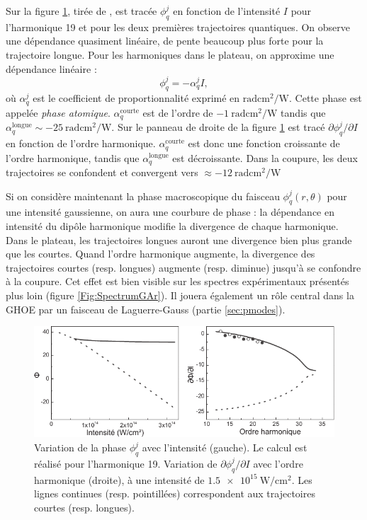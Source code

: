 Sur la figure \ref{fig:varju}, tirée de , est tracée $\phi^j_q$ en fonction de l'intensité $I$ pour l'harmonique 19 et pour les deux premières trajectoires quantiques. On observe une dépendance quasiment linéaire, de pente beaucoup plus forte pour la trajectoire longue. Pour les harmoniques dans le plateau, on approxime une dépendance linéaire :
\begin{equation}
\phi^j_q = - \alpha_q^j I,
\label{eq:alphaI}
\end{equation}
où $\alpha_q^j$ est le coefficient de proportionnalité exprimé en $\si{\radian\cm\squared\per\W}$. Cette phase est appelée \textit{phase atomique}. $\alpha_q^{\text{courte}}$ est de l'ordre de $\SI{-1}{\radian\cm\squared\per\W}$ tandis que $\alpha_q^{\text{longue}}\sim\SI{-25}{\radian\cm\squared\per\W}$. Sur le panneau de droite de la figure \ref{fig:varju} est tracé $\partial\phi^j_q/\partial I$ en fonction de l'ordre harmonique. $\alpha_q^{\text{courte}}$ est donc une fonction croissante de l'ordre harmonique, tandis que $\alpha_q^{\text{longue}}$ est décroissante. Dans la coupure, les deux trajectoires se confondent et convergent vers $\approx \SI{-12}{\radian\cm\squared\per\W}$\par
Si on considère maintenant la phase macroscopique du faisceau $\phi^j_q(r,\theta)$ pour une intensité gaussienne, on aura une courbure de phase : la dépendance en intensité du dipôle harmonique modifie la divergence de chaque harmonique. Dans le plateau, les trajectoires longues auront une divergence bien plus grande que les courtes. Quand l'ordre harmonique augmente, la divergence des trajectoires courtes (resp. longues) augmente (resp. diminue) jusqu'à se confondre à la coupure. Cet effet est bien visible sur les spectres expérimentaux présentés plus loin (figure \ref{Fig:SpectrumGAr}). Il jouera également un rôle central dans la GHOE par un faisceau de Laguerre-Gauss (partie \ref{sec:pmodes}).

\begin{figure}[!ht]
\centering
\includegraphics[width=1\columnwidth]{Figures/ThreeStep/alphaI_varju.pdf}%
\caption{Variation de la phase $\phi^j_q$ avec l'intensité (gauche). Le calcul est réalisé pour l'harmonique 19. Variation de $\partial\phi^j_q/\partial I$ avec l'ordre harmonique (droite), à une intensité de $\SI{1.5e15}{\W\per\cm\squared}$. Les lignes continues (resp. pointillées) correspondent aux trajectoires courtes (resp. longues).}
\label{fig:varju}
\end{figure}

